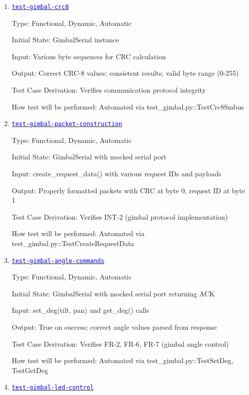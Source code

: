 \documentclass[12pt, titlepage]{article}
\newcommand{\tid}[1]{\hyperlink{tid:#1}{\textcolor{blue}{\texttt{#1}}}}
\begin{document}
\begin{enumerate}

  \item{\tid{test-gimbal-crc8}\\}

        Type: Functional, Dynamic, Automatic

        Initial State: GimbalSerial instance

        Input: Various byte sequences for CRC calculation

        Output: Correct CRC-8 values; consistent results; valid byte range (0-255)

        Test Case Derivation: Verifies communication protocol integrity

        How test will be performed: Automated via test\_gimbal.py::TestCrc8Smbus

  \item{\tid{test-gimbal-packet-construction}\\}

        Type: Functional, Dynamic, Automatic

        Initial State: GimbalSerial with mocked serial port

        Input: create\_request\_data() with various request IDs and payloads

        Output: Properly formatted packets with CRC at byte 0, request ID at byte 1

        Test Case Derivation: Verifies INT-2 (gimbal protocol implementation)

        How test will be performed: Automated via
        test\_gimbal.py::TestCreateRequestData

  \item{\tid{test-gimbal-angle-commands}\\}

        Type: Functional, Dynamic, Automatic

        Initial State: GimbalSerial with mocked serial port returning ACK

        Input: set\_deg(tilt, pan) and get\_deg() calls

        Output: True on success; correct angle values parsed from response

        Test Case Derivation: Verifies FR-2, FR-6, FR-7 (gimbal angle control)

        How test will be performed: Automated via test\_gimbal.py::TestSetDeg,
        TestGetDeg

  \item{\tid{test-gimbal-led-control}\\}


\end{enumerate}
\end{document}
